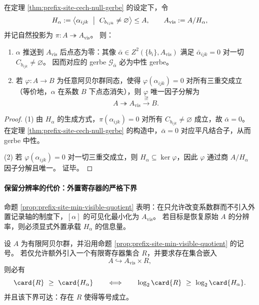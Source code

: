 \begin{proposition}[使障碍点态消失的最小系数商]\label{prop:prefix-site-min-visible-quotient}
在定理 \ref{thm:prefix-site-cech-null-gerbe} 的设定下，令
\[
H_\alpha:=\bigl\langle \alpha_{ijk}\ \bigm|\ C_{b_{ijk}}\neq\varnothing \bigr\rangle\le A,
\qquad
A_{\mathrm{vis}}:=A/H_\alpha,
\]
并记自然投影为 \(\pi:A\twoheadrightarrow A_{\mathrm{vis}}\)。
则：
\begin{enumerate}
  \item \(\alpha\) 推送到 \(A_{\mathrm{vis}}\) 后点态为零：其像 \(\bar\alpha\in Z^2(\{b_i\},A_{\mathrm{vis}})\) 满足 \(\bar\alpha_{ijk}=0\) 对一切 \(C_{b_{ijk}}\neq\varnothing\)。
  因而对应的 gerbe \(\mathcal{G}_{\bar\alpha}\) 必为中性 gerbe。
  \item 若 \(\varphi:A\to B\) 为任意阿贝尔群同态，使得 \(\varphi(\alpha_{ijk})=0\) 对所有三重交成立（等价地，\(\alpha\) 在系数 \(B\) 下点态消失），则 \(\varphi\) 唯一因子分解为
  \[
  A\twoheadrightarrow A_{\mathrm{vis}}\xrightarrow{\ \exists!\ } B.
  \]
\end{enumerate}
\end{proposition}

\begin{proof}
(1) 由 \(H_\alpha\) 的生成方式，\(\pi(\alpha_{ijk})=0\) 对所有 \(C_{b_{ijk}}\neq\varnothing\) 成立，故 \(\bar\alpha=0\)。
在定理 \ref{thm:prefix-site-cech-null-gerbe} 的构造中，\(\bar\alpha=0\) 对应平凡结合子，从而 gerbe 中性。
\par
(2) 若 \(\varphi(\alpha_{ijk})=0\) 对一切三重交成立，则 \(H_\alpha\subseteq\ker\varphi\)，因此 \(\varphi\) 通过商 \(A/H_\alpha\) 因子分解且唯一。
证毕。
\end{proof}

\paragraph{保留分辨率的代价：外置寄存器的严格下界}
命题 \ref{prop:prefix-site-min-visible-quotient} 表明：在只允许改变系数群而不引入外置记录轴的制度下，\([\alpha]\) 的可见化最小化为 \(A_{\mathrm{vis}}\)。
若目标是恢复原始 \(A\) 的分辨率，则必须显式外置承载 \(H_\alpha\) 的信息量。

\begin{theorem}[恢复 \(A\)-分辨率所需的最小寄存器容量]\label{thm:prefix-site-register-lower-bound}
设 \(A\) 为有限阿贝尔群，并沿用命题 \ref{prop:prefix-site-min-visible-quotient} 的记号。
若仅允许额外引入一个有限寄存器集合 \(R\)，并要求存在集合嵌入
\[
A\hookrightarrow A_{\mathrm{vis}}\times R,
\]
则必有
\[
\card{R}\ \ge\ \card{H_\alpha}
\qquad\Longleftrightarrow\qquad
\log_2\card{R}\ \ge\ \log_2\card{H_\alpha}.
\]
并且该下界可达：存在 \(R\) 使得等号成立。
\end{theorem}


